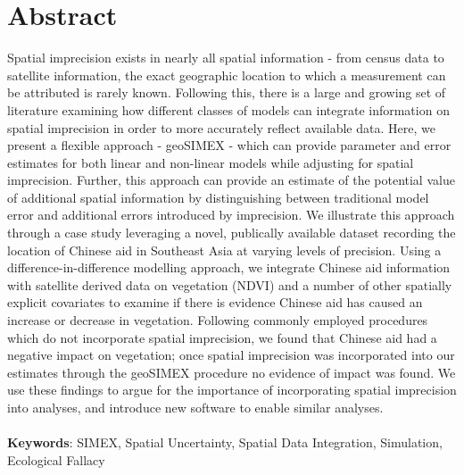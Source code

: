 \section{Abstract}
Spatial imprecision exists in nearly all spatial information - from census data to satellite information, the exact geographic location to which a measurement can be attributed is rarely known.
Following this, there is a large and growing set of literature examining how different classes of models can integrate information on spatial imprecision in order to more accurately reflect available data.
Here, we present a flexible approach - geoSIMEX - which can provide parameter and error estimates for both linear and non-linear models while adjusting for spatial imprecision.
Further, this approach can provide an estimate of the potential value of additional spatial information by distinguishing between traditional model error and additional errors introduced by imprecision.
We illustrate this approach through a case study leveraging a novel, publically available dataset recording the location of Chinese aid in Southeast Asia at varying levels of precision.
Using a difference-in-difference modelling approach, we integrate Chinese aid information with satellite derived data on vegetation (NDVI) and a number of other spatially explicit covariates to examine if there is evidence Chinese aid has caused an increase or decrease in vegetation.
Following commonly employed procedures which do not incorporate spatial imprecision, we found that Chinese aid had a negative impact on vegetation; once spatial imprecision was incorporated into our estimates through the geoSIMEX procedure no evidence of impact was found.
We use these findings to argue for the importance of incorporating spatial imprecision into analyses, and introduce new software to enable similar analyses. \\
\\
\textbf{Keywords}: SIMEX, Spatial Uncertainty, Spatial Data Integration, Simulation, Ecological Fallacy\\

\newpage
